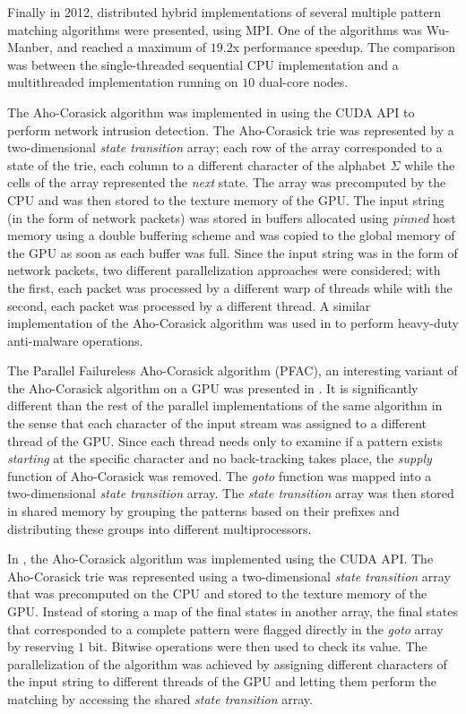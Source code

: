 \documentclass{ws-ijait}
\begin{document}
Finally in 2012, distributed hybrid implementations of several multiple pattern matching algorithms were presented,\cite{Kouzinopoulos2012} using MPI. One of the algorithms was Wu-Manber, and reached a maximum of $19.2$x performance speedup. The comparison was between the single-threaded sequential CPU implementation and a multithreaded implementation running on $10$ dual-core nodes.

The Aho-Corasick algorithm was implemented in \cite{Vasiliadis2008} using the CUDA API to perform network intrusion detection. The Aho-Corasick trie was represented by a two-dimensional \textit{state transition} array; each row of the array corresponded to a state of the trie, each column to a different character of the alphabet $\Sigma$ while the cells of the array represented the \textit{next} state. The array was precomputed by the CPU and was then stored to the texture memory of the GPU. The input string (in the form of network packets) was stored in buffers allocated using \textit{pinned} host memory using a double buffering scheme and was copied to the global memory of the GPU as soon as each buffer was full. Since the input string was in the form of network packets, two different parallelization approaches were considered; with the first, each packet was processed by a different warp of threads while with the second, each packet was processed by a different thread. A similar implementation of the Aho-Corasick algorithm was used in \cite{Vasiliadis2010} to perform heavy-duty anti-malware operations.

The Parallel Failureless Aho-Corasick algorithm (PFAC), an interesting variant of the Aho-Corasick algorithm on a GPU was presented in \cite{Lin2010}. It is significantly different than the rest of the parallel implementations of the same algorithm in the sense that each character of the input stream was assigned to a different thread of the GPU. Since each thread needs only to examine if a pattern exists \textit{starting} at the specific character and no back-tracking takes place, the \textit{supply} function of Aho-Corasick was removed. The \textit{goto} function was mapped into a two-dimensional \textit{state transition} array. The \textit{state transition} array was then stored in shared memory by grouping the patterns based on their prefixes and distributing these groups into different multiprocessors.

In \cite{Tumeo2011}, the Aho-Corasick algorithm was implemented using the CUDA API. The Aho-Corasick trie was represented using a two-dimensional \textit{state transition} array that was precomputed on the CPU and stored to the texture memory of the GPU. Instead of storing a map of the final states in another array, the final states that corresponded to a complete pattern were flagged directly in the \textit{goto} array by reserving $1$ bit. Bitwise operations were then used to check its value. The parallelization of the algorithm was achieved by assigning different characters of the input string to different threads of the GPU and letting them perform the matching by accessing the shared \textit{state transition} array.
\end{document}
